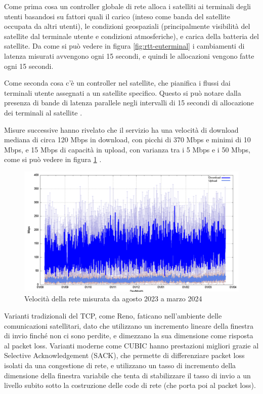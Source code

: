 Come prima cosa un controller globale di rete alloca i satelliti ai terminali degli utenti basandosi su fattori quali il carico (inteso come banda del satellite occupata da altri utenti), le condizioni geospaziali (principalmente visibilità del satellite dal terminale utente e condizioni atmosferiche), e carica della batteria del satellite.
Da come si può vedere in figura \ref{fig:rtt-euterminal} i cambiamenti di latenza misurati avvengono ogni 15 secondi, e quindi le allocazioni vengono fatte ogni 15 secondi.

Come seconda cosa c'è un controller nel satellite, che pianifica i flussi dai terminali utente assegnati a un satellite specifico.
Questo si può notare dalla presenza di bande di latenza parallele negli intervalli di 15 secondi di allocazione dei terminali al satellite \cite{tanveer_making_2023} \cite{geoff_huston_transport_2024}.

Misure successive hanno rivelato che il servizio ha una velocità di download mediana di circa 120 Mbps in download, con picchi di 370 Mbps e minimi di 10 Mbps, e 15 Mbps di capacità in upload, con varianza tra i 5 Mbps e i 50 Mbps, come si può vedere in figura \ref{fig:starlink-performance} \cite{geoff_huston_transport_2024}.

\begin{figure}[htbp]
  \centering
  \includegraphics[width=0.7\linewidth]{./res/img/starlink_performance.png}
  \caption{Velocità della rete misurata da agosto 2023 a marzo 2024}
  \label{fig:starlink-performance}
\end{figure}

Varianti tradizionali del \ac{TCP}, come Reno, faticano nell'ambiente delle comunicazioni satellitari, dato che utilizzano un incremento lineare della finestra di invio finché non ci sono perdite, e dimezzano la sua dimensione come risposta al packet loss.
Varianti moderne come CUBIC hanno prestazioni migliori grazie al Selective Acknowledgement (SACK), che permette di differenziare packet loss isolati da una congestione di rete, e utilizzano un tasso di incremento della dimensione della finestra variabile che tenta di stabilizzare il tasso di invio a un livello subito sotto la costruzione delle code di rete (che porta poi al packet loss).

